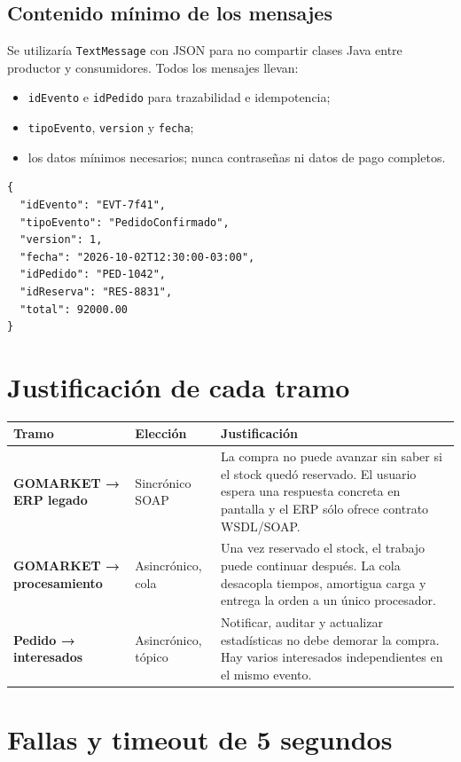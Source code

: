 \documentclass[11pt,a4paper]{article}
\begin{document}
\subsection{Contenido mínimo de los mensajes}

Se utilizaría \texttt{TextMessage} con JSON para no compartir clases Java entre
productor y consumidores. Todos los mensajes llevan:

\begin{itemize}
  \item \texttt{idEvento} e \texttt{idPedido} para trazabilidad e idempotencia;
  \item \texttt{tipoEvento}, \texttt{version} y \texttt{fecha};
  \item los datos mínimos necesarios; nunca contraseñas ni datos de pago completos.
\end{itemize}

\begin{Verbatim}[frame=single,framesep=4pt,rulecolor=\color{linegray},fontsize=\scriptsize]
{
  "idEvento": "EVT-7f41",
  "tipoEvento": "PedidoConfirmado",
  "version": 1,
  "fecha": "2026-10-02T12:30:00-03:00",
  "idPedido": "PED-1042",
  "idReserva": "RES-8831",
  "total": 92000.00
}
\end{Verbatim}

\section{Justificación de cada tramo}

\begin{tabularx}{\textwidth}{@{}>{\bfseries}p{3.5cm} p{2.3cm} X@{}}
\toprule
Tramo & Elección & Justificación \\
\midrule
GOMARKET → ERP legado & Sincrónico SOAP & La compra no puede avanzar sin saber si el stock quedó reservado. El usuario espera una respuesta concreta en pantalla y el ERP sólo ofrece contrato WSDL/SOAP. \\
GOMARKET → procesamiento & Asincrónico, cola & Una vez reservado el stock, el trabajo puede continuar después. La cola desacopla tiempos, amortigua carga y entrega la orden a un único procesador. \\
Pedido → interesados & Asincrónico, tópico & Notificar, auditar y actualizar estadísticas no debe demorar la compra. Hay varios interesados independientes en el mismo evento. \\
\bottomrule
\end{tabularx}

\section{Fallas y timeout de 5 segundos}
\end{document}
